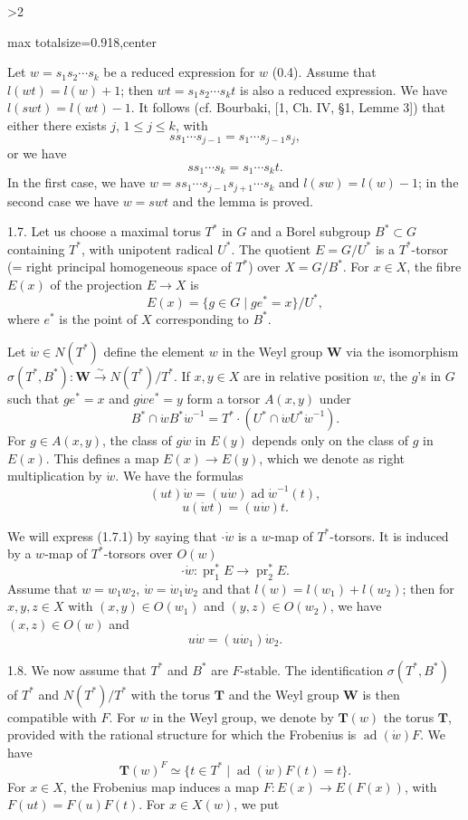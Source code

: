 \documentclass[9pt,twoside]{extarticle}
\newcommand{\EditionPage}[3]{%
  \ifnum#1>2\clearpage\fi
  \pdfbookmark[1]{Printed page #2}{en-folio-#2}%
  \hypertarget{en-physical-#1}{}%
  \noindent\begin{adjustbox}{max totalsize={\textwidth}{0.918\textheight},center}
  \begin{minipage}[t]{\textwidth}
  \fontsize{9.4}{11.1}\selectfont\justifying
  #3
  \end{minipage}
  \end{adjustbox}%
}
\begin{document}
\EditionPage{9}{110}{%
Let \(w=s_1s_2\cdots s_k\) be a reduced expression for \(w\) (0.4). Assume that \(l(wt)=l(w)+1\); then \(wt=s_1s_2\cdots s_kt\) is also a reduced expression. We have \(l(swt)=l(wt)-1\). It follows (cf. Bourbaki, [1, Ch. IV, §1, Lemme 3]) that either there exists \(j\), \(1\le j\le k\), with \[
ss_1\cdots s_{j-1}=s_1\cdots s_{j-1}s_j,
\] or we have \[
ss_1\cdots s_k=s_1\cdots s_kt.
\] In the first case, we have \(w=ss_1\cdots s_{j-1}s_{j+1}\cdots s_k\) and \(l(sw)=l(w)-1\); in the second case we have \(w=swt\) and the lemma is proved.\par

1.7. Let us choose a maximal torus \(T^*\) in \(G\) and a Borel subgroup \(B^*\subset G\) containing \(T^*\), with unipotent radical \(U^*\). The quotient \(E=G/U^*\) is a \(T^*\)-torsor (= right principal homogeneous space of \(T^*\)) over \(X=G/B^*\). For \(x\in X\), the fibre \(E(x)\) of the projection \(E\to X\) is \[
E(x)=\{g\in G\mid ge^*=x\}/U^*,
\] where \(e^*\) is the point of \(X\) corresponding to \(B^*\).\par

Let \(\dot w\in N(T^*)\) define the element \(w\) in the Weyl group \(\mathbf W\) via the isomorphism \(\sigma(T^*,B^*):\mathbf W\xrightarrow{\sim}N(T^*)/T^*\). If \(x,y\in X\) are in relative position \(w\), the \(g\)'s in \(G\) such that \(ge^*=x\) and \(g\dot we^*=y\) form a torsor \(A(x,y)\) under \[
B^*\cap \dot wB^*\dot w^{-1}=T^*\cdot(U^*\cap \dot wU^*\dot w^{-1}).
\] For \(g\in A(x,y)\), the class of \(g\dot w\) in \(E(y)\) depends only on the class of \(g\) in \(E(x)\). This defines a map \(E(x)\to E(y)\), which we denote as right multiplication by \(\dot w\). We have the formulas \[
\tag{1.7.1}
(ut)\dot w=(u\dot w)\operatorname{ad}\dot w^{-1}(t),
\]  \[
\tag{1.7.2}
u(\dot w t)=(u\dot w)t.
\]\par

We will express (1.7.1) by saying that \(\cdot\dot w\) is a \(w\)-map of \(T^*\)-torsors. It is induced by a \(w\)-map of \(T^*\)-torsors over \(O(w)\)  \[
\cdot\dot w:\operatorname{pr}_1^*E\longrightarrow\operatorname{pr}_2^*E.
\] Assume that \(w=w_1w_2\), \(\dot w=\dot w_1\dot w_2\) and that \(l(w)=l(w_1)+l(w_2)\); then for \(x,y,z\in X\) with \((x,y)\in O(w_1)\) and \((y,z)\in O(w_2)\), we have \((x,z)\in O(w)\) and \[
\tag{1.7.3}
u\dot w=(u\dot w_1)\dot w_2.
\]\par

1.8. We now assume that \(T^*\) and \(B^*\) are \(F\)-stable. The identification \(\sigma(T^*,B^*)\) of \(T^*\) and \(N(T^*)/T^*\) with the torus \(\mathbf T\) and the Weyl group \(\mathbf W\) is then compatible with \(F\). For \(w\) in the Weyl group, we denote by \(\mathbf T(w)\) the torus \(\mathbf T\), provided with the rational structure for which the Frobenius is \(\operatorname{ad}(\dot w)F\). We have \[
\mathbf T(w)^F\simeq\{t\in T^*\mid \operatorname{ad}(\dot w)F(t)=t\}.
\] For \(x\in X\), the Frobenius map induces a map \(F:E(x)\to E(F(x))\), with \(F(ut)=F(u)F(t)\). For \(x\in X(w)\), we put\par
}
\end{document}
